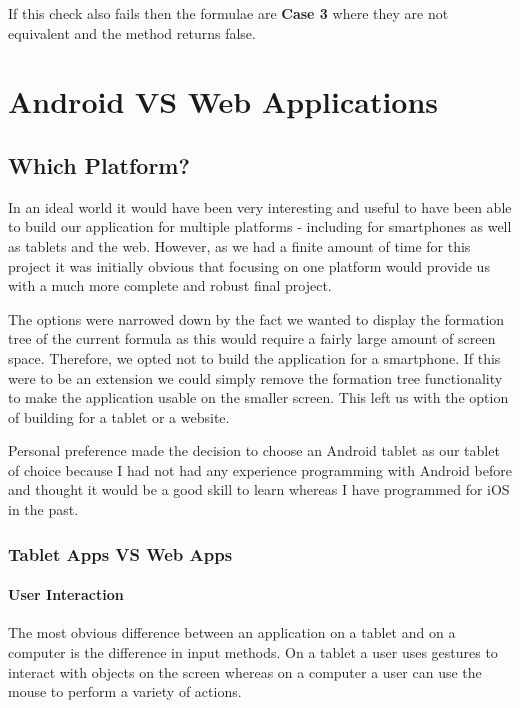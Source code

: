 \documentclass{report}
\begin{document}
If this check also fails then the formulae are \textbf{Case 3} where they are not equivalent and the method returns false.

\chapter{Android VS Web Applications}

\section{Which Platform?}

In an ideal world it would have been very interesting and useful to have been able to build our application for multiple platforms - including for smartphones as well as tablets and the web. However, as we had a finite amount of time for this project it was initially obvious that focusing on one platform would provide us with a much more complete and robust final project.

The options were narrowed down by the fact we wanted to display the formation tree of the current formula as this would require a fairly large amount of screen space. Therefore, we opted not to build the application for a smartphone. If this were to be an extension we could simply remove the formation tree functionality to make the application usable on the smaller screen. This left us with the option of building for a tablet or a website.

Personal preference made the decision to choose an Android tablet as our tablet of choice because I had not had any experience programming with Android before and thought it would be a good skill to learn whereas I have programmed for iOS in the past. 

\subsection{Tablet Apps VS Web Apps}

\subsubsection{User Interaction}

The most obvious difference between an application on a tablet and on a computer is the difference in input methods. On a tablet a user uses gestures to interact with objects on the screen whereas on a computer a user can use the mouse to perform a variety of actions.
\end{document}
